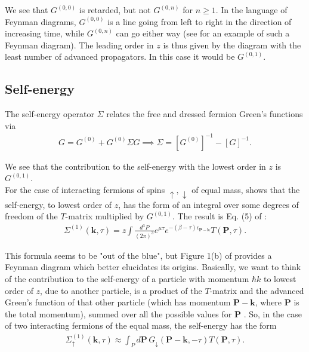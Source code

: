 \documentclass{article}
\theoremstyle{definition}
\begin{document}
\noindent We see that $G^{(0,0)}$ is retarded, but not $G^{(0,n)}$ for $n\geq 1$. In the language of Feynman diagrams, $G^{(0,0)}$ is a  line going from left to right in the direction of increasing time, while $G^{(0,n)}$ can go either way (see \cite{barth2014pairing} for an example of such a Feynman diagram). The leading order in $z$ is thus given by the diagram with the least number of advanced propagators. In this case it would be $G^{(0,1)}$.\\


\subsection{Self-energy}

\noindent The self-energy operator $\Sigma$ relates the free and dressed fermion Green's functions via 
\begin{align}
G = G^{(0)} + G^{(0)} \Sigma G \implies \Sigma = [G^{(0)}]^{-1} - [G]^{-1}.
\end{align}

\noindent We see that the contribution to the self-energy with the lowest order in $z$ is $G^{(0,1)}$. \\

\noindent For the case of interacting fermions of spins $\uparrow, \downarrow$ of equal mass, \cite{ngampruetikorn2013pair} shows that the self-energy, to lowest order of $z$, has the form of an integral over some degrees of freedom of the $T$-matrix multiplied by $G^{(0,1)}$. The result is Eq. (5) of \cite{sun2015high}:
\begin{align}
\Sigma^{(1)}(\mathbf{k},\tau) = z \int \frac{d^3P}{(2\pi)^3} e^{\mu\tau} e^{-(\beta-\tau) \epsilon_\mathbf{P-k}} T(\mathbf{P},\tau).
\end{align}


\noindent This formula seems to be "out of the blue", but Figure 1(b) of  \cite{ngampruetikorn2013pair} provides a Feynman diagram which better elucidates its origins. Basically, we want to think of the contribution to the self-energy of a particle with momentum $\hbar k$ to lowest order of $z$, due to another particle, is a product of the $T$-matrix and the advanced Green's function of that other particle (which has momentum $\mathbf{P} - \mathbf{k}$, where $\mathbf{P}$ is the total momentum), summed over all the possible values for $\mathbf{P}$ \cite{leyronas2011virial}. So, in the case of two interacting fermions of the equal mass, the self-energy has the form
\begin{align}
\Sigma^{(1)}_\uparrow(\mathbf{k}, \tau) \approx \int_P d\mathbf{P} \, G_\downarrow(\mathbf{P} - \mathbf{k},-\tau) T(\mathbf{P}, \tau).
\end{align}
\end{document}
